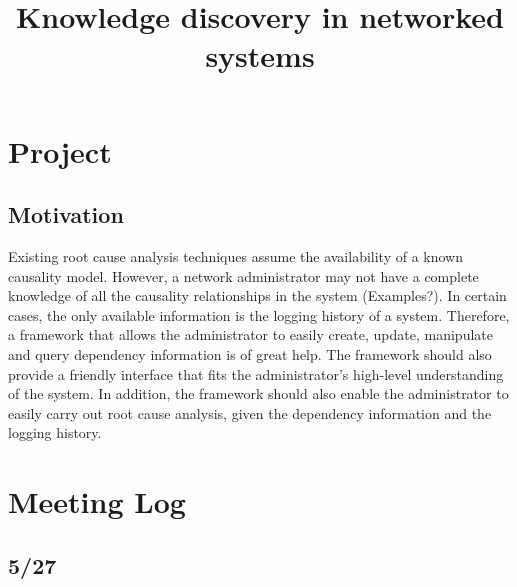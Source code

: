 \documentclass{article}
\begin{document}


\title{Knowledge discovery in networked systems}
\author{}

\maketitle


\section{Project}
\label{sec:project}

\subsection{Motivation}
\label{sec:motiv}

Existing root cause analysis techniques assume the availability of a known
causality model. However, a network administrator may not have a complete
knowledge of all the causality relationships in the system (Examples?). In
certain cases, the only available information is the logging history of a
system. Therefore, a framework that allows the administrator to easily
create, update, manipulate and query dependency information is of great help. The
framework should also provide a friendly interface that fits the administrator's
high-level understanding of the system. In addition, the framework should also
enable the administrator to easily carry out root cause analysis, given the
dependency information and the logging history.



\section{Meeting Log}
\label{sec:meetlog}

\subsection{5/27}
\end{document}
